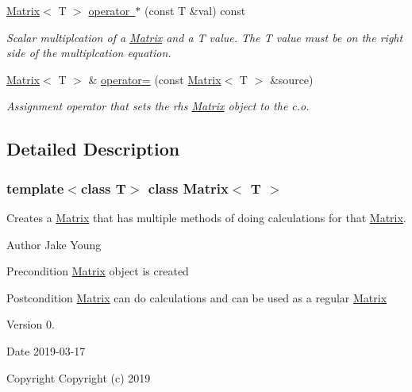 \begin{DoxyCompactItemize}
\mbox{\hyperlink{class_matrix}{Matrix}}$<$ T $>$ \mbox{\hyperlink{class_matrix_a9b987f07fb3d4fcf2b038cbfd6615650}{operator $\ast$}} (const T \&val) const
\begin{DoxyCompactList}\small\item\em Scalar multiplcation of a \mbox{\hyperlink{class_matrix}{Matrix}} and a T value. The T value must be on the right side of the multiplcation equation. \end{DoxyCompactList}\item 
\mbox{\hyperlink{class_matrix}{Matrix}}$<$ T $>$ \& \mbox{\hyperlink{class_matrix_a33c00fb6f2e9401d17d9ed615b965634}{operator=}} (const \mbox{\hyperlink{class_matrix}{Matrix}}$<$ T $>$ \&source)
\begin{DoxyCompactList}\small\item\em Assignment operator that sets the rhs \mbox{\hyperlink{class_matrix}{Matrix}} object to the c.\+o. \end{DoxyCompactList}\end{DoxyCompactItemize}


\subsection{Detailed Description}
\subsubsection*{template$<$class T$>$\newline
class Matrix$<$ T $>$}

Creates a \mbox{\hyperlink{class_matrix}{Matrix}} that has multiple methods of doing calculations for that \mbox{\hyperlink{class_matrix}{Matrix}}. 

\begin{DoxyAuthor}{Author}
Jake Young 
\end{DoxyAuthor}
\begin{DoxyPrecond}{Precondition}
\mbox{\hyperlink{class_matrix}{Matrix}} object is created 
\end{DoxyPrecond}
\begin{DoxyPostcond}{Postcondition}
\mbox{\hyperlink{class_matrix}{Matrix}} can do calculations and can be used as a regular \mbox{\hyperlink{class_matrix}{Matrix}} 
\end{DoxyPostcond}
\begin{DoxyVersion}{Version}
0. 
\end{DoxyVersion}
\begin{DoxyDate}{Date}
2019-\/03-\/17
\end{DoxyDate}
\begin{DoxyCopyright}{Copyright}
Copyright (c) 2019 
\end{DoxyCopyright}


